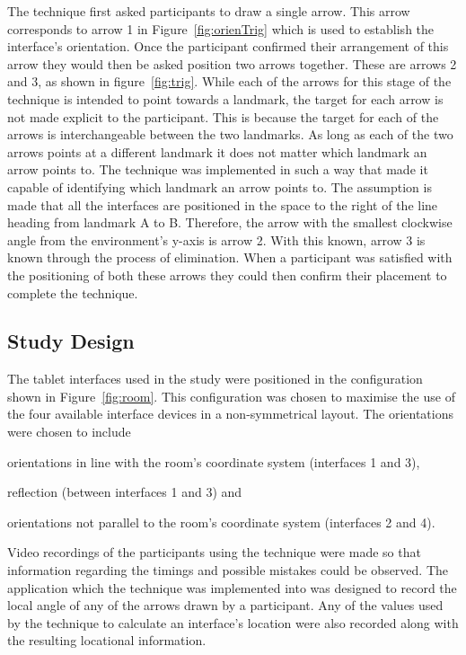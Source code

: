 \documentclass{bmcart}
\begin{document}
The technique first asked participants to draw a single arrow.
This arrow corresponds to arrow 1 in Figure~\ref{fig:orienTrig} which is used to establish the interface's orientation.
Once the participant confirmed their arrangement of this arrow they would then be asked position two arrows together.
These are arrows 2 and 3, as shown in figure~\ref{fig:trig}.
While each of the arrows for this stage of the technique is intended to point towards a landmark, the target for each arrow is not made explicit to the participant.
This is because the target for each of the arrows is interchangeable between the two landmarks.
As long as each of the two arrows points at a different landmark it does not matter which landmark an arrow points to.
The technique was implemented in such a way that made it capable of identifying which landmark an arrow points to.
The assumption is made that all the interfaces are positioned in the space to the right of the line heading from landmark A to B.
Therefore, the arrow with the smallest clockwise angle from the environment's y-axis is arrow 2.
With this known, arrow 3 is known through the process of elimination.
When a participant was satisfied with the positioning of both these arrows they could then confirm their placement to complete the technique.

\subsection*{Study Design}\label{sec:design}


The tablet interfaces used in the study were positioned in the configuration shown in Figure~\ref{fig:room}.
This configuration was chosen to maximise the use of the four available interface devices in a non-symmetrical layout.
The orientations were chosen to include 
\begin{inparaenum}[(i)] 
\item orientations in line with the room's coordinate system (interfaces 1 and 3), 
\item reflection (between interfaces 1 and 3) and 
\item orientations not parallel to the room's coordinate system (interfaces 2 and 4).
\end{inparaenum}

Video recordings of the participants using the technique were made so that information regarding the timings and possible mistakes could be observed.
The application which the technique was implemented into was designed to record the local angle of any of the arrows drawn by a participant.
Any of the values used by the technique to calculate an interface's location were also recorded along with the resulting locational information.
\end{document}

